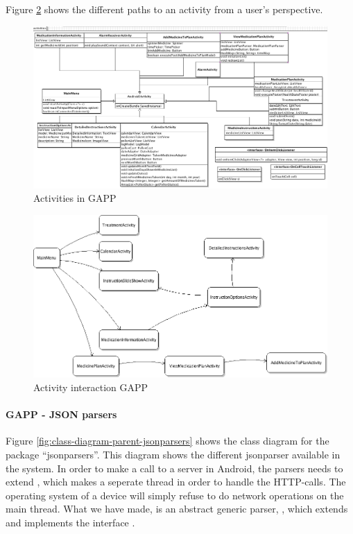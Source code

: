 Figure \ref{fig:activitiy-interaction} shows the different paths to an activity from a user's perspective. 
   
\begin{figure}
	\centering
		\includegraphics[width = 17.5 cm]{Pictures/ArchPictures/activities.png}
	\caption{Activities in GAPP}
	\label{fig:class-diagram-parent-activities}
\end{figure}

\begin{figure}
	\centering
		\includegraphics[width = 17.5 cm]{Pictures/ArchPictures/gapparchpictures/ActivityInteractionDiagram.png}
	\caption{Activity interaction GAPP}
	\label{fig:activitiy-interaction}
\end{figure}


\paragraph{GAPP - JSON parsers}
Figure \ref{fig:class-diagram-parent-jsonparsers} shows the class diagram for the package ``jsonparsers''.
This diagram shows the different jsonparser available in the system. In order to make a call to a server in Android, the parsers needs to extend , which
makes a seperate thread in order to handle the HTTP-calls. The operating system of a device will simply refuse to do network
operations on the main thread.
What we have made, is an abstract generic parser, , which extends  and implements the interface .

